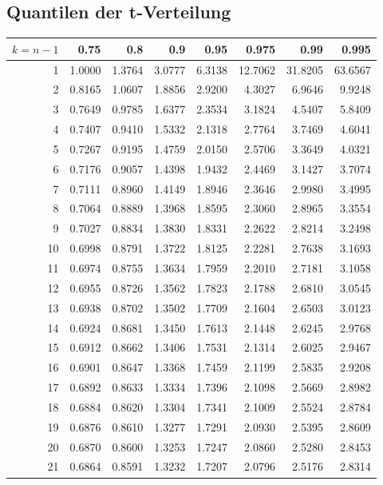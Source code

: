 \begin{minipage}{18cm}
\begin{tabular}{|r|rrr|rrr|rrr|}
\hline
\end{tabular}

    \end{minipage}
\newpage

	\subsection{Quantilen der t-Verteilung}
	\begin{minipage}{18cm}
    	\centering
    	\scriptsize
 \begin{tabular}{|r|rrrrrrr|}
\hline
$k = n-1$&0.75&0.8&0.9&0.95&0.975&0.99&0.995\\
\hline
1&1.0000&1.3764&3.0777&6.3138&12.7062&31.8205&63.6567\\
2&0.8165&1.0607&1.8856&2.9200&4.3027&6.9646&9.9248\\
3&0.7649&0.9785&1.6377&2.3534&3.1824&4.5407&5.8409\\
4&0.7407&0.9410&1.5332&2.1318&2.7764&3.7469&4.6041\\
5&0.7267&0.9195&1.4759&2.0150&2.5706&3.3649&4.0321\\
6&0.7176&0.9057&1.4398&1.9432&2.4469&3.1427&3.7074\\
7&0.7111&0.8960&1.4149&1.8946&2.3646&2.9980&3.4995\\
8&0.7064&0.8889&1.3968&1.8595&2.3060&2.8965&3.3554\\
9&0.7027&0.8834&1.3830&1.8331&2.2622&2.8214&3.2498\\
10&0.6998&0.8791&1.3722&1.8125&2.2281&2.7638&3.1693\\
11&0.6974&0.8755&1.3634&1.7959&2.2010&2.7181&3.1058\\
12&0.6955&0.8726&1.3562&1.7823&2.1788&2.6810&3.0545\\
13&0.6938&0.8702&1.3502&1.7709&2.1604&2.6503&3.0123\\
14&0.6924&0.8681&1.3450&1.7613&2.1448&2.6245&2.9768\\
15&0.6912&0.8662&1.3406&1.7531&2.1314&2.6025&2.9467\\
16&0.6901&0.8647&1.3368&1.7459&2.1199&2.5835&2.9208\\
17&0.6892&0.8633&1.3334&1.7396&2.1098&2.5669&2.8982\\
18&0.6884&0.8620&1.3304&1.7341&2.1009&2.5524&2.8784\\
19&0.6876&0.8610&1.3277&1.7291&2.0930&2.5395&2.8609\\
20&0.6870&0.8600&1.3253&1.7247&2.0860&2.5280&2.8453\\
21&0.6864&0.8591&1.3232&1.7207&2.0796&2.5176&2.8314\\

\end{tabular}
\end{minipage}
